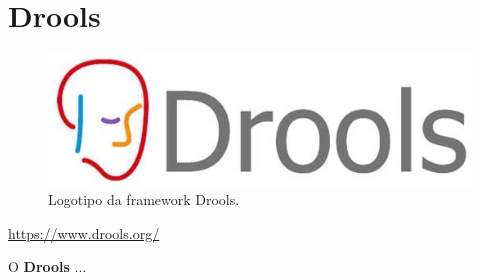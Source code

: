 \section{Drools}
\label{subsec:drools}

\begin{figure}[H]
    \centering
    \includegraphics[scale=0.2]{images/drools.jpg}
    \caption{Logotipo da framework Drools.}
    \label{fig:drools}
\end{figure}

\href{https://www.drools.org/}{https://www.drools.org/}

\hspace{5mm} O \textbf{Drools} ...